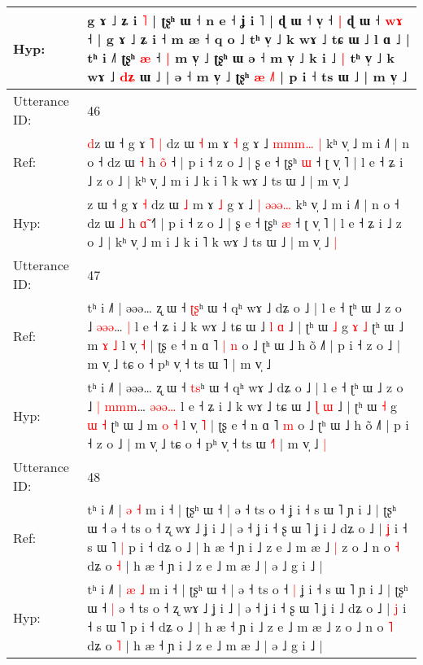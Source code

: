 \documentclass[10pt]{article}
\DeclareRobustCommand{\hl}[1]{{\textcolor{red}{#1}}}
\begin{document}
\begin{longtable}{ll}
 \\
Hyp: & g ɤ ˩ ʑ i \hl{˥} | ʈʂʰ ɯ ˧ n e ˧ ʝ i ˥ | ɖ ɯ ˧ v̩ ˧\hl{ }\hl{|} ɖ ɯ ˧ \hl{w}\hl{ɤ} ˧ | g ɤ ˩ ʑ i ˧\hl{}\hl{} m æ ˧ q o ˩ tʰ v̩ ˩ k wɤ ˩ tɕ ɯ ˩ l ɑ ˩ | tʰ i ˩˥\hl{}\hl{} ʈʂʰ \hl{æ} ˧\hl{}\hl{} \hl{|} m v̩ ˩ ʈʂʰ ɯ\hl{}\hl{}\hl{}\hl{} ə ˧ m v̩ ˩ k i ˩\hl{ }\hl{|} tʰ v̩ ˩ k wɤ ˩ \hl{d}\hl{ʑ} ɯ\hl{}\hl{}\hl{}\hl{}\hl{}\hl{} ˩ | ə ˧ m v̩ ˩\hl{}\hl{} ʈʂʰ\hl{}\hl{}\hl{}\hl{}\hl{}\hl{}\hl{}\hl{}\hl{}\hl{} \hl{æ} \hl{}\hl{˩}˥ | p i ˧ ts ɯ ˩ | m v̩ ˩
 \\
\midrule
Utterance ID: & 46 \\
Ref: & \hl{d}z ɯ ˧ g ɤ\hl{ }\hl{˥} \hl{|} dz ɯ \hl{˧} m ɤ \hl{˧} g ɤ ˩ \hl{m}\hl{m}\hl{m}\hl{…}\hl{ }\hl{|} kʰ v̩ ˩ m i ˩˥ | n o ˧ dz ɯ \hl{˧} h \hl{o}̃ ˧\hl{} | p i ˧ z o ˩ | ʂ e ˧ ʈʂʰ \hl{ɯ} ˧ ʈ v̩ ˥ | l e ˧ ʑ i ˩ z o ˩ | kʰ v̩ ˩ m i ˩ k i ˥ k wɤ ˩ ts ɯ ˩ | m v̩ ˩\hl{}\hl{}
 \\
Hyp: & \hl{}z ɯ ˧ g ɤ\hl{}\hl{} \hl{˧} dz ɯ \hl{˩} m ɤ \hl{˩} g ɤ ˩ \hl{|}\hl{ }\hl{ə}\hl{ə}\hl{ə}\hl{…} kʰ v̩ ˩ m i ˩˥ | n o ˧ dz ɯ \hl{˩} h \hl{ɑ}̃ ˧\hl{˥} | p i ˧ z o ˩ | ʂ e ˧ ʈʂʰ \hl{æ} ˧ ʈ v̩ ˥ | l e ˧ ʑ i ˩ z o ˩ | kʰ v̩ ˩ m i ˩ k i ˥ k wɤ ˩ ts ɯ ˩ | m v̩ ˩\hl{ }\hl{|}
 \\
\midrule
Utterance ID: & 47 \\
Ref: & tʰ i ˩˥ | əəə… ʐ ɯ ˧ \hl{ʈ}\hl{ʂ}ʰ ɯ ˧ qʰ wɤ ˩ dʑ o ˩ | l e ˧ ʈʰ ɯ ˩ z o ˩\hl{}\hl{} \hl{ə}\hl{ə}\hl{ə}… \hl{}\hl{}\hl{}\hl{|} l e ˧ ʑ i ˩ k wɤ ˩ tɕ ɯ ˩ \hl{l} \hl{ɑ} ˩ | ʈʰ ɯ \hl{˩} g \hl{ɤ} \hl{˩} ʈʰ ɯ ˩ m \hl{ɤ} \hl{˩} l v̩ \hl{˧} | ʈʂ e ˧ n ɑ ˥\hl{ }\hl{|} \hl{n} o ˩ ʈʰ ɯ ˩ h õ ˩˥ | p i ˧ z o ˩ | m v̩ ˩ tɕ o ˧ pʰ v̩ ˧ ts ɯ \hl{}˥ | m v̩ ˩\hl{}\hl{}
 \\
Hyp: & tʰ i ˩˥ | əəə… ʐ ɯ ˧ \hl{t}\hl{s}ʰ ɯ ˧ qʰ wɤ ˩ dʑ o ˩ | l e ˧ ʈʰ ɯ ˩ z o ˩\hl{ }\hl{|} \hl{m}\hl{m}\hl{m}… \hl{ə}\hl{ə}\hl{ə}\hl{…} l e ˧ ʑ i ˩ k wɤ ˩ tɕ ɯ ˩ \hl{ɭ} \hl{ɯ} ˩ | ʈʰ ɯ \hl{˧} g \hl{ɯ} \hl{˧} ʈʰ ɯ ˩ m \hl{o} \hl{˧} l v̩ \hl{˥} | ʈʂ e ˧ n ɑ ˥\hl{}\hl{} \hl{m} o ˩ ʈʰ ɯ ˩ h õ ˩˥ | p i ˧ z o ˩ | m v̩ ˩ tɕ o ˧ pʰ v̩ ˧ ts ɯ \hl{˧}˥ | m v̩ ˩\hl{ }\hl{|}
 \\
\midrule
Utterance ID: & 48 \\
Ref: & tʰ i ˩˥ | \hl{ə} \hl{˧} m i ˧ | ʈʂʰ ɯ ˧ | ə ˧ ts o ˧\hl{}\hl{} ʝ i ˧ s ɯ ˥ ɲ i ˩ | ʈʂʰ ɯ ˧\hl{}\hl{} ə ˧ ts o ˧ ʐ wɤ ˩ ʝ i ˩ | ə ˧ ʝ i ˧ ʂ ɯ ˥ ʝ i ˩ dʑ o ˩ | \hl{ʝ} i ˧ s ɯ ˥\hl{ }\hl{|} p i ˧ dʑ o ˩ | h æ ˧ ɲ i ˩ z e ˩ m æ ˩\hl{ }\hl{|} z o ˩ n o \hl{˧} dʑ o \hl{˧} | h æ ˧ ɲ i ˩ z e ˩ m æ ˩ | ə ˩ g i ˩ |
 \\
Hyp: & tʰ i ˩˥ | \hl{æ} \hl{˩} m i ˧ | ʈʂʰ ɯ ˧ | ə ˧ ts o ˧\hl{ }\hl{|} ʝ i ˧ s ɯ ˥ ɲ i ˩ | ʈʂʰ ɯ ˧\hl{ }\hl{|} ə ˧ ts o ˧ ʐ wɤ ˩ ʝ i ˩ | ə ˧ ʝ i ˧ ʂ ɯ ˥ ʝ i ˩ dʑ o ˩ | \hl{j} i ˧ s ɯ ˥\hl{}\hl{} p i ˧ dʑ o ˩ | h æ ˧ ɲ i ˩ z e ˩ m æ ˩\hl{}\hl{} z o ˩ n o \hl{˥} dʑ o \hl{˥} | h æ ˧ ɲ i ˩ z e ˩ m æ ˩ | ə ˩ g i ˩ |

\end{longtable}
\end{document}
